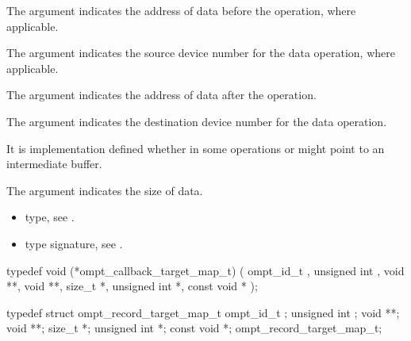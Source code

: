 The argument  indicates the address of data 
before the operation, where applicable.

The argument  indicates the source device number
for the data operation, where applicable.

The argument  indicates the address of data 
after the operation.

The argument  indicates the destination device
number for the data operation.

It is implementation defined whether in some operations  
or  might point to an intermediate buffer.

The argument  indicates the size of data.

\codeptrdesc

\crossreferences
\begin{itemize}
\item {} type, see
.
\item {} type signature, see
.
\end{itemize}



\label{sec:ompt_callback_target_map_t}
\format

\begin{ccppspecific}
\begin{omptCallback}
typedef void (*ompt_callback_target_map_t) (
  ompt_id_t ,
  unsigned int ,
  void **,
  void **,
  size_t *,
  unsigned int *,
  const void *
);
\end{omptCallback}
\end{ccppspecific}


\record

\begin{ccppspecific}
\begin{omptRecord}
typedef struct ompt_record_target_map_t {
  ompt_id_t ;
  unsigned int ;
  void **;
  void **;
  size_t *;
  unsigned int *;
  const void *;
} ompt_record_target_map_t;
\end{omptRecord}
\end{ccppspecific}


